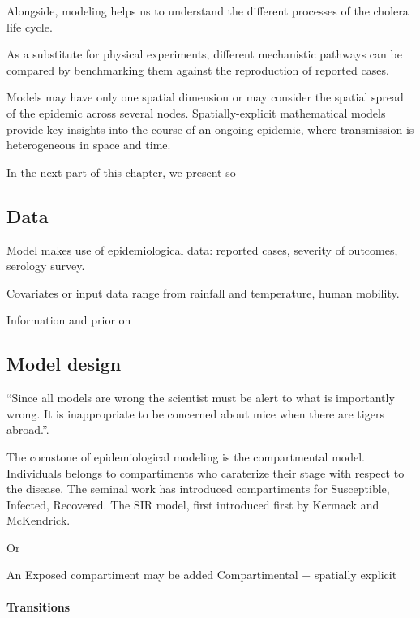 Alongside, modeling helps us to understand the different processes of the cholera life cycle. 

As a substitute for physical experiments, different mechanistic pathways can be compared by benchmarking them against the reproduction of reported cases. 

Models may have only one spatial dimension or may consider the spatial spread of the epidemic across several nodes. Spatially-explicit mathematical models provide key insights into the course of an ongoing epidemic, where transmission is heterogeneous in space and time.



In the next part of this chapter, we present so

\subsection{Data}
Model makes use of epidemiological data: reported cases, severity of outcomes, serology survey. 

Covariates or input data range from rainfall and temperature, human mobility.

Information and prior on



\subsection{Model design}

“Since all models are wrong the scientist must be alert to what is importantly wrong. It is inappropriate to be concerned about mice when there are tigers abroad.”\cite{Box:ScienceStatistics:1976}.

The cornstone of epidemiological modeling is the compartmental model. Individuals belongs to compartiments who caraterize their stage with respect to the disease. The seminal work has introduced compartiments for Susceptible, Infected, Recovered. The SIR model, first introduced first by Kermack and McKendrick\cite{Kermack:ContributionMathematicalTheory:1927}. 

Or

An Exposed compartiment may be added 
Compartimental + spatially explicit

\paragraph{Transitions}



